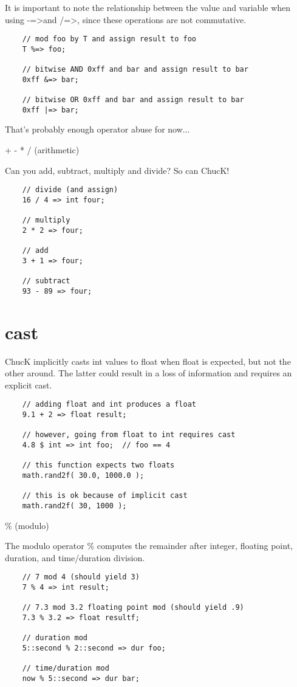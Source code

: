 It is important to note the relationship between the value and variable when using -=\textgreater and /=\textgreater, since these operations are not commutative.
\begin{verbatim}
    // mod foo by T and assign result to foo
    T %=> foo;

    // bitwise AND 0xff and bar and assign result to bar
    0xff &=> bar;

    // bitwise OR 0xff and bar and assign result to bar
    0xff |=> bar;
\end{verbatim}

That's probably enough operator abuse for now...
 
+ - * / (arithmetic)

Can you add, subtract, multiply and divide? So can ChucK!
\begin{verbatim}
    // divide (and assign)
    16 / 4 => int four;

    // multiply
    2 * 2 => four;

    // add
    3 + 1 => four;

    // subtract
    93 - 89 => four;
\end{verbatim}

\section{cast}

ChucK implicitly casts int values to float when float is expected, but not the other around. The latter could result in a loss of information and requires an explicit cast.
\begin{verbatim}
    // adding float and int produces a float
    9.1 + 2 => float result;

    // however, going from float to int requires cast
    4.8 $ int => int foo;  // foo == 4

    // this function expects two floats
    math.rand2f( 30.0, 1000.0 );

    // this is ok because of implicit cast
    math.rand2f( 30, 1000 );
\end{verbatim}
 

\% (modulo)

The modulo operator \% computes the remainder after integer, floating point, duration, and time/duration division.
\begin{verbatim}
    // 7 mod 4 (should yield 3)
    7 % 4 => int result;

    // 7.3 mod 3.2 floating point mod (should yield .9)
    7.3 % 3.2 => float resultf;

    // duration mod
    5::second % 2::second => dur foo;

    // time/duration mod
    now % 5::second => dur bar;
\end{verbatim}

